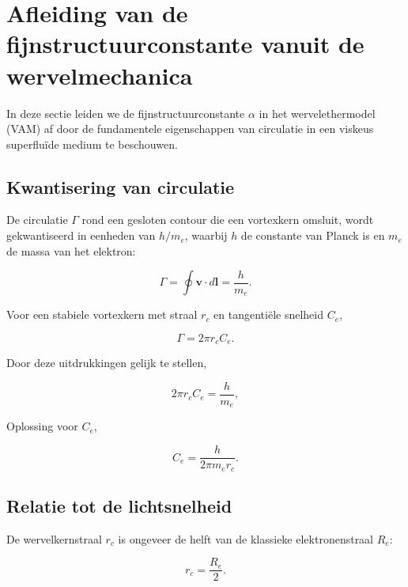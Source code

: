 
\section{Afleiding van de fijnstructuurconstante vanuit de wervelmechanica}
\label{sec:appendix-alpha}

In deze sectie leiden we de fijnstructuurconstante $\alpha$ in het wervelethermodel (VAM) af door de fundamentele eigenschappen van circulatie in een viskeus superfluïde medium te beschouwen.

\subsection{Kwantisering van circulatie}

De circulatie $\Gamma$ rond een gesloten contour die een vortexkern omsluit, wordt gekwantiseerd in eenheden van $h/m_e$, waarbij $h$ de constante van Planck is en $m_e$ de massa van het elektron:

\begin{equation}
\Gamma = \oint \mathbf{v} \cdot d\mathbf{l} = \frac{h}{m_e}.
\end{equation}

Voor een stabiele vortexkern met straal $r_c$ en tangentiële snelheid $C_e$,

\begin{equation}
\Gamma = 2 \pi r_c C_e.
\end{equation}

Door deze uitdrukkingen gelijk te stellen,

\begin{equation}
2 \pi r_c C_e = \frac{h}{m_e},
\end{equation}

Oplossing voor $C_e$,

\begin{equation}
C_e = \frac{h}{2 \pi m_e r_c}.
\end{equation}

\subsection{Relatie tot de lichtsnelheid}

De wervelkernstraal $r_c$ is ongeveer de helft van de klassieke elektronenstraal $R_e$:

\begin{equation}
r_c = \frac{R_e}{2}. \end{equation}

